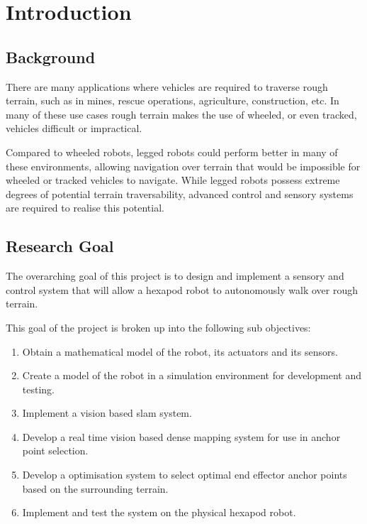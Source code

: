 \chapter{Introduction}

\section{Background}

There are many applications where vehicles are required to traverse rough terrain, such as in mines, rescue operations, agriculture, construction, etc. In many of these
use cases rough terrain makes the use of wheeled, or even tracked, vehicles difficult or impractical.

Compared to wheeled robots, legged robots could perform better in many of these environments, allowing navigation over terrain that would be impossible for wheeled or
tracked vehicles to navigate. While legged robots possess extreme degrees of potential terrain traversability, advanced control and sensory systems are required to 
realise this potential.


\section{Research Goal}
The overarching goal of this project is to design and implement a sensory and control system that will allow a hexapod robot to autonomously walk over rough terrain.

This goal of the project is broken up into the following sub objectives:

\begin{enumerate}
    \item Obtain a mathematical model of the robot, its actuators and its sensors.
    \item Create a model of the robot in a simulation environment for development and testing.
    \item Implement a vision based \ac{slam} system.
    \item Develop a real time vision based dense mapping system for use in anchor point selection.
    \item Develop a optimisation system to select optimal end effector anchor points based on the surrounding terrain.
    \item Implement and test the system on the physical hexapod robot.
\end{enumerate}


